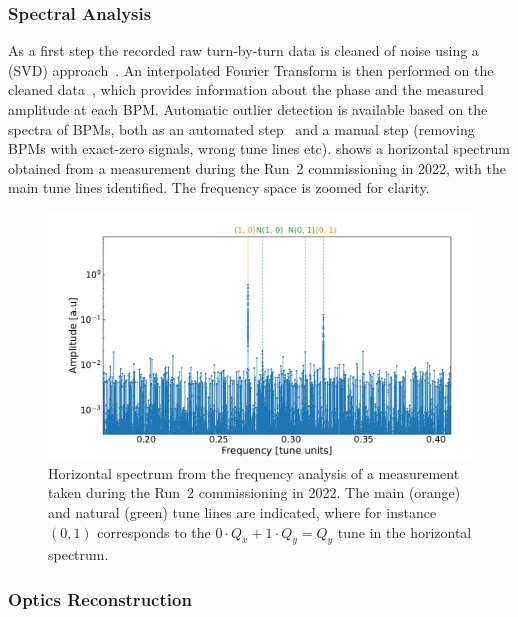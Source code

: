 \subsubsection*{Spectral Analysis}

As a first step the recorded raw turn-by-turn data is cleaned of noise using a  (SVD) approach~\cite{PRAB:Calaga:Statistical_Analysis_RHIC_BPMs}.
An interpolated Fourier Transform is then performed on the cleaned data~\cite{PHD:Malina,IPAC:Malina:Harpy_Fast_Simple}, which provides information about the phase and the measured amplitude at each BPM.
Automatic outlier detection is available based on the spectra of BPMs, both as an automated step~\cite{PRAB:Fol:Detection_Faulty_BPMs} and a manual step (removing BPMs with exact-zero signals, wrong tune lines etc).
 shows a horizontal spectrum obtained from a measurement during the Run~\num{2} commissioning in \num{2022}, with the main tune lines identified.
The frequency space is zoomed for clarity.

\begin{figure}[!htb]
  \centering
  \includegraphics*[width=\linewidth]{Figures/Optics_Measurements_Corrections_at_LHC/example_bpm_spectrum.pdf}
  \caption{Horizontal spectrum from the frequency analysis of a measurement taken during the Run~\num{2} commissioning in \num{2022}. The main (\textcolor{mplorange}{orange}) and natural (\textcolor{mplgreen}{green}) tune lines are indicated, where for instance \((0, 1)\) corresponds to the \(0 \cdot Q_x + 1 \cdot Q_y = Q_y\) tune in the horizontal spectrum.}
  \label{figure:example_spectrum}
\end{figure}

\subsubsection*{Optics Reconstruction}

